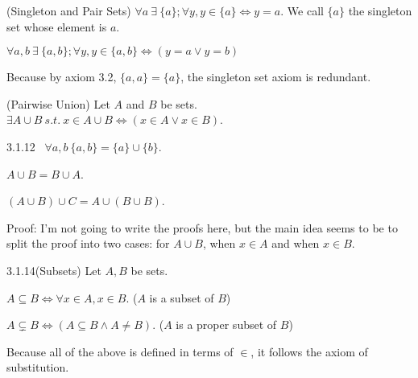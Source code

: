 \documentclass[letterpaper]{article}
\begin{document}
\begin{axbox}{3.4}{(Singleton and Pair Sets)}
  $\forall a ~\exists ~\{a\}; \forall y, y \in \{a\} \iff y = a$.
  We call $\{a\}$ the singleton set whose element is $a$.

  \medskip

  $\forall a,b ~\exists~ \{a,b\}; \forall y, y \in \{a,b\} \iff (y = a \lor y = b)$
\end{axbox}

Because by axiom 3.2, $\{a,a\} = \{a\}$, the singleton set axiom is redundant.

\begin{axbox}{3.5}{(Pairwise Union)}
  Let $A$ and $B$ be sets. $\exists A \cup B ~s.t.~ x \in A \cup B \iff (x \in A \lor x \in B)$.
\end{axbox}

\begin{lebox}{3.1.12}{~}
  $\forall a,b ~  \{a,b\} = \{a\} \cup \{b\}$.

  $A \cup B = B \cup A$.

  $(A \cup B) \cup C = A \cup (B \cup B)$.

  \begin{paragraph}{Proof:}
    I'm not going to write the proofs here, but the main idea seems to be to split the proof into two cases: for $A \cup B$, when $x \in A$ and when $x \in B$.
  \end{paragraph}
\end{lebox}

\begin{defbox}{3.1.14}{(Subsets)}
  Let $A, B$ be sets.

  $A \subseteq B \iff \forall x \in A, x \in B$. ($A$ is a subset of $B$)

  $A \subsetneq B \iff (A \subseteq B \land A \neq B)$. ($A$ is a proper subset of $B$)
\end{defbox}

Because all of the above is defined in terms of $\in$, it follows the axiom of substitution.
\end{document}

